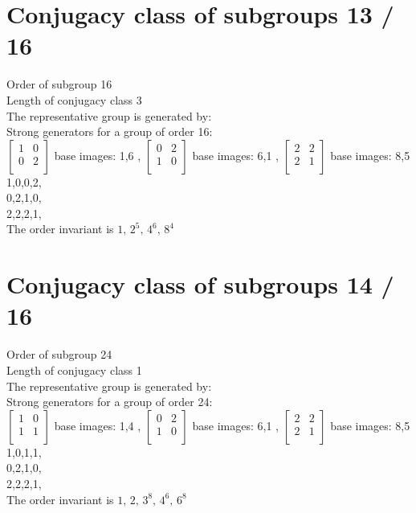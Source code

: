 \section{Conjugacy class of subgroups 13 / 16}
Order of subgroup 16\\
Length of conjugacy class 3\\
The representative group is generated by:\\
Strong generators for a group of order 16:\\
$
\left[
\begin{array}{*{2}{r}}
1 & 0\\
0 & 2\\
\end{array}
\right]
$
base images: 1,6 , 
$
\left[
\begin{array}{*{2}{r}}
0 & 2\\
1 & 0\\
\end{array}
\right]
$
base images: 6,1 , 
$
\left[
\begin{array}{*{2}{r}}
2 & 2\\
2 & 1\\
\end{array}
\right]
$
base images: 8,5 \\
1,0,0,2,\\
0,2,1,0,\\
2,2,2,1,\\
The order invariant is $1,\,2^5,\,4^6,\,8^4$\\
\section{Conjugacy class of subgroups 14 / 16}
Order of subgroup 24\\
Length of conjugacy class 1\\
The representative group is generated by:\\
Strong generators for a group of order 24:\\
$
\left[
\begin{array}{*{2}{r}}
1 & 0\\
1 & 1\\
\end{array}
\right]
$
base images: 1,4 , 
$
\left[
\begin{array}{*{2}{r}}
0 & 2\\
1 & 0\\
\end{array}
\right]
$
base images: 6,1 , 
$
\left[
\begin{array}{*{2}{r}}
2 & 2\\
2 & 1\\
\end{array}
\right]
$
base images: 8,5 \\
1,0,1,1,\\
0,2,1,0,\\
2,2,2,1,\\
The order invariant is $1,\,2,\,3^8,\,4^6,\,6^8$\\
